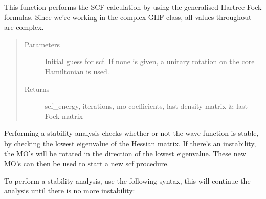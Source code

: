 \documentclass[letterpaper,10pt,english]{sphinxmanual}
\begin{document}
\begin{fulllineitems}
\begin{fulllineitems}
\label{\detokenize{Complex_GHF:ghf.complex_GHF.ComplexGHF.scf}}
This function performs the SCF calculation by using the generalised Hartree-Fock formulas. Since we’re working
in the complex GHF class, all values throughout are complex.
\begin{quote}\begin{description}
\item[{Parameters}] \leavevmode
{} \textendash{} Initial guess for scf. If none is given, a unitary rotation on the core Hamiltonian is used.

\item[{Returns}] \leavevmode
scf\_energy, iterations, mo coefficients, last density matrix \& last Fock matrix

\end{description}\end{quote}

\end{fulllineitems}


\begin{fulllineitems}
\label{\detokenize{Complex_GHF:ghf.complex_GHF.ComplexGHF.stability}}
Performing a stability analysis checks whether or not the wave function is stable, by checking the lowest
eigenvalue of the Hessian matrix. If there’s an instability, the MO’s will be rotated in the direction
of the lowest eigenvalue. These new MO’s can then be used to start a new scf procedure.

To perform a stability analysis, use the following syntax, this will continue the analysis until there is
no more instability:


\end{fulllineitems}
\end{fulllineitems}
\end{document}
